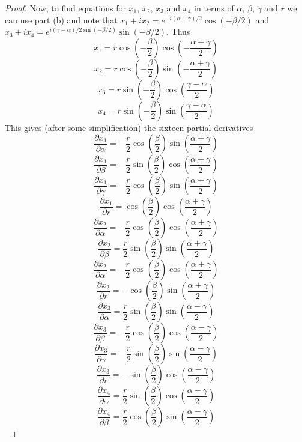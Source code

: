 \documentclass{article}
\begin{document}
\begin{proof}
Now, to find equations for $x_1$, $x_2$, $x_3$ and $x_4$ in terms of $\alpha$, $\beta$, $\gamma$ and $r$ we can use part (b) and note that $x_1 + ix_2 = e^{-i (\alpha + \gamma)/2} \cos (-\beta/2)$ and $x_3 + i x_4 = e^{i(\gamma - \alpha)/2 \sin(-\beta/2)} \sin(-\beta/2)$. Thus
\[
x_1 = r \cos \left (-\frac{\beta}{2} \right ) \cos \left (-\frac{\alpha + \gamma}{2} \right )
\]
\[
x_2 = r \cos \left (-\frac{\beta}{2} \right ) \sin \left (-\frac{\alpha + \gamma}{2} \right )
\]
\[
x_3 = r \sin \left (-\frac{\beta}{2} \right ) \cos \left (\frac{\gamma - \alpha}{2} \right )
\]
\[
x_4 = r \sin \left (-\frac{\beta}{2} \right ) \sin \left (\frac{\gamma - \alpha}{2} \right )
\]
This gives (after some simplification) the sixteen partial derivatives
\[
\frac{\partial x_1}{\partial \alpha} = -\frac{r}{2} \cos \left ( \frac{\beta}{2} \right ) \sin \left (\frac{\alpha + \gamma}{2} \right )
\]
\[
\frac{\partial x_1}{\partial \beta} = -\frac{r}{2} \sin \left ( \frac{\beta}{2} \right ) \cos \left (\frac{\alpha + \gamma}{2} \right )
\]
\[
\frac{\partial x_1}{\partial \gamma} = -\frac{r}{2} \cos \left ( \frac{\beta}{2} \right ) \sin \left (\frac{\alpha + \gamma}{2} \right )
\]
\[
\frac{\partial x_1}{\partial r} = \cos \left ( \frac{\beta}{2} \right ) \cos \left (\frac{\alpha + \gamma}{2} \right )
\]
\[
\frac{\partial x_2}{\partial \alpha} = -\frac{r}{2} \cos \left ( \frac{\beta}{2} \right ) \cos \left (\frac{\alpha + \gamma}{2} \right )
\]
\[
\frac{\partial x_2}{\partial \beta} = \frac{r}{2} \sin \left ( \frac{\beta}{2} \right ) \sin \left (\frac{\alpha + \gamma}{2} \right )
\]
\[
\frac{\partial x_2}{\partial \alpha} = -\frac{r}{2} \cos \left ( \frac{\beta}{2} \right ) \cos \left (\frac{\alpha + \gamma}{2} \right )
\]
\[
\frac{\partial x_2}{\partial r} = -\cos \left ( \frac{\beta}{2} \right ) \sin \left (\frac{\alpha + \gamma}{2} \right )
\]
\[
\frac{\partial x_3}{\partial \alpha} = \frac{r}{2} \sin \left ( \frac{\beta}{2} \right ) \sin \left (\frac{\alpha - \gamma}{2} \right )
\]
\[
\frac{\partial x_3}{\partial \beta} = -\frac{r}{2} \cos \left ( \frac{\beta}{2} \right ) \cos \left (\frac{\alpha - \gamma}{2} \right )
\]
\[
\frac{\partial x_3}{\partial \gamma} = -\frac{r}{2} \sin \left ( \frac{\beta}{2} \right ) \sin \left (\frac{\alpha - \gamma}{2} \right )
\]
\[
\frac{\partial x_3}{\partial r} = -\sin \left ( \frac{\beta}{2} \right ) \cos \left (\frac{\alpha - \gamma}{2} \right )
\]
\[
\frac{\partial x_4}{\partial \alpha} = \frac{r}{2} \sin \left ( \frac{\beta}{2} \right ) \cos \left (\frac{\alpha - \gamma}{2} \right )
\]
\[
\frac{\partial x_4}{\partial \beta} = \frac{r}{2} \cos \left ( \frac{\beta}{2} \right ) \sin \left (\frac{\alpha - \gamma}{2} \right )
\]
\end{proof}
\end{document}
